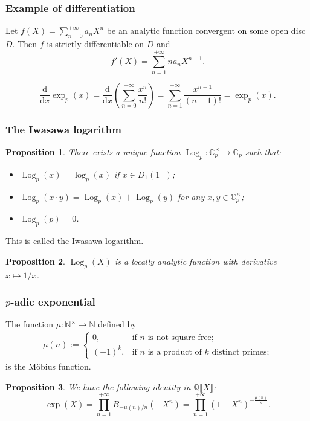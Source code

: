 \documentclass{beamer}
\DeclareMathOperator{\Log}{Log} 		%
\newcommand{\N}{ \mathbb{N} }
\newcommand{\Q}{ \mathbb{Q} }
\newcommand{\C}{ \mathbb{C} }
\newcommand{\Cp}{ \C_p }
\newcommand{\padic}{$p$-adic }
\newcommand{\ser}[1]{ \llbracket {#1} \rrbracket } %
\theoremstyle{plain}
\newtheorem{prop}{Proposition}
\begin{document}
	\begin{frame}
		\frametitle{Example of differentiation}
		\begin{theorem}
			Let $f(X) = \sum_{n=0}^{+\infty} a_nX^n$ be an analytic function convergent on some open disc $D$. Then $f$ is strictly differentiable on $D$ and
			\[
				f'(X) = \sum_{n=1}^{+\infty} na_nX^{n-1}.
			\]
		\end{theorem}
		\pause
		\begin{example}
			\[
				\frac{\mathrm{d}}{\mathrm{d}x}\exp_p(x) = \frac{\mathrm{d}}{\mathrm{d}x}\left( \sum_{n=0}^{+\infty} \frac{x^n}{n!} \right) = \sum_{n=1}^{+\infty} \frac{x^{n-1}}{(n-1)!} = \exp_p(x).
			\]
		\end{example}
	\end{frame}
	\begin{frame}
		\frametitle{The Iwasawa logarithm}
		\begin{prop}
			There exists a unique function $\Log_p\colon \Cp^{\times} \to \Cp$ such that:
			\begin{itemize}
				\item $\Log_p(x) = \log_p(x)$ if $x \in D_1(1^-)$;
				\item $\Log_p(x\cdot y) = \Log_p(x) + \Log_p(y)$ for any $x, y \in \Cp^{\times}$;
				\item $\Log_p(p) = 0$.
			\end{itemize}
		\end{prop}
		This is called the \alert{Iwasawa logarithm}.
		\pause
		\begin{prop}
			$\Log_p(X)$ is a locally analytic function with derivative $x \mapsto 1/x$.
		\end{prop}
	\end{frame}
	\begin{frame}
		\frametitle{\padic exponential}
		\begin{definition}
			The function $\mu\colon \N^{\times} \to \N$ defined by
			\begin{gather*}
				\mu(n) :=
				\begin{cases}
					0, & \text{if $n$ is not square-free;} \\
					(-1)^k, & \text{if $n$ is a product of $k$ distinct primes;}
				\end{cases}
			\end{gather*}
			is the \alert{M{\"o}bius function}.
		\end{definition}
		\pause
		\begin{prop}
			We have the following identity in $\Q\ser{X}$:
			\[
				\exp(X) = \prod_{n=1}^{+\infty} B_{-\mu(n)/n}(-X^n) = \prod_{n=1}^{+\infty} (1 - X^n)^{-\frac{\mu(n)}{n}}.
			\]
		\end{prop}
	\end{frame}
\end{document}
